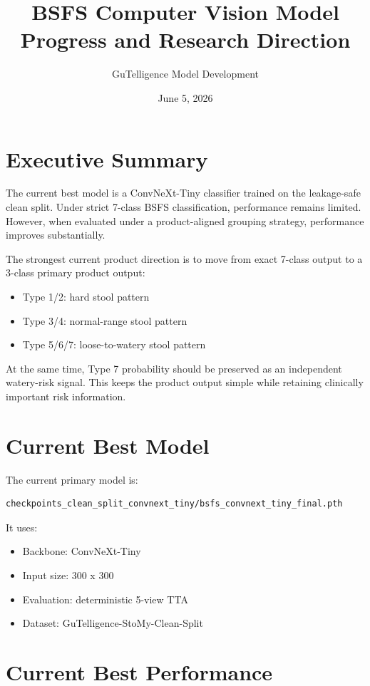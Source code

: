 \documentclass[11pt]{article}
\title{BSFS Computer Vision Model Progress and Research Direction}
\author{GuTelligence Model Development}
\date{June 5, 2026}
\begin{document}
\maketitle

\section{Executive Summary}

The current best model is a ConvNeXt-Tiny classifier trained on the leakage-safe clean split. Under strict 7-class BSFS classification, performance remains limited. However, when evaluated under a product-aligned grouping strategy, performance improves substantially.

The strongest current product direction is to move from exact 7-class output to a 3-class primary product output:

\begin{itemize}
    \item Type 1/2: hard stool pattern
    \item Type 3/4: normal-range stool pattern
    \item Type 5/6/7: loose-to-watery stool pattern
\end{itemize}

At the same time, Type 7 probability should be preserved as an independent watery-risk signal. This keeps the product output simple while retaining clinically important risk information.

\section{Current Best Model}

The current primary model is:

\begin{verbatim}
checkpoints_clean_split_convnext_tiny/bsfs_convnext_tiny_final.pth
\end{verbatim}

It uses:

\begin{itemize}
    \item Backbone: ConvNeXt-Tiny
    \item Input size: 300 x 300
    \item Evaluation: deterministic 5-view TTA
    \item Dataset: GuTelligence-StoMy-Clean-Split
\end{itemize}

\section{Current Best Performance}
\end{document}
